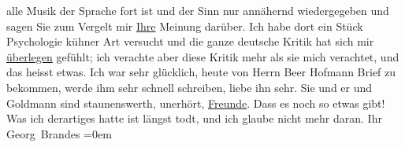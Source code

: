 \begin{ledgroupsized}[t]{13cm}
               alle Musik der Sprache fort ist und der Sinn nur annähernd wiedergegeben und sagen
               Sie zum Vergelt mir \uline{Ihre} Meinung darüber. Ich habe
               dort ein Stück Psychologie kühner Art versucht und die ganze deutsche Kritik hat sich
               mir \uline{überlegen} gefühlt; ich verachte aber diese Kritik
               mehr als sie mich verachtet, und das heisst etwas.\pend
           \pstart
           Ich war sehr glücklich, heute von Herrn Beer
                  Hofmann Brief zu bekommen, werde ihm sehr schnell schreiben, liebe ihn sehr.
               Sie und er und Goldmann sind staunenswerth,
               unerhört, \uline{Freunde}. Dass es noch so etwas gibt! Was
               ich derartiges hatte ist längst todt, und ich glaube nicht mehr daran.\pend
           \pstart
           Ihr{\\[\baselineskip]}\spacefill\mbox{Georg Brandes}\pend
           \leftskip=0em{}\endnumbering{}\end{ledgroupsized}  \newcommand{\dateiname}{L00639}\newcommand{\titel}{Georg Brandes an Arthur Schnitzler, 16. 1. 1897}\newcommand{\editorInnen}{Martin Anton Müller und Gerd-Hermann Susen}
            \footnotesize
\begin{ledgroupsized}[t]{11.5cm}
\end{ledgroupsized}
         
      